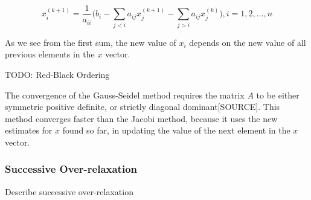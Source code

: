 $$ x_i^{(k+1)} = \frac{1}{a_{ii}} \Big( b_i - \sum_{j < i} a_{ij} x_j^{(k+1)} - \sum_{j > i} a_{ij} x_j^{(k)} \Big),  i = 1, 2, \ldots, n $$

As we see from the first sum, the new value of $x_i$ depends on the new value of 
all previous elements in the $x$ vector.

TODO: Red-Black Ordering

The convergence of the Gauss-Seidel method requires the matrix $A$ to be either symmetric positive definite, or strictly diagonal dominant[SOURCE]. This method converges faster than the Jacobi method, because it uses the new estimates for $x$ found so far, in updating the value of the next element in the $x$ vector.

\subsubsection*{Successive Over-relaxation}

Describe successive over-relaxation
